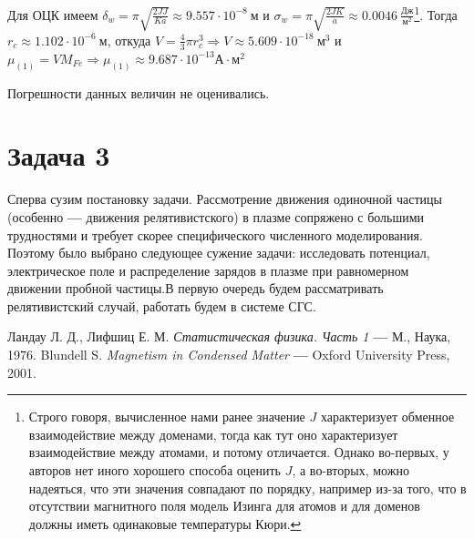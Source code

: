 \documentclass[oneside,final,14pt]{extarticle}
\begin{document}
	Для ОЦК имеем $\delta_{w}=\pi \sqrt{\frac{2JJ}{Ka}}\approx 9.557\cdot 10^{-8} \ \text{м}$ и $\sigma_{w}=\pi \sqrt{\frac{2JK}{a}}\approx 0.0046 \ \frac{\text{Дж}}{\text{м}^2}$\footnote{Строго говоря, вычисленное нами ранее значение $J$ характеризует обменное взаимодействие между доменами, тогда как тут оно характеризует взаимодействие между атомами, и потому отличается. Однако во-первых, у авторов нет иного хорошего способа оценить $J$, а во-вторых, можно надеяться, что эти значения совпадают по порядку, например из-за того, что в отсутствии магнитного поля модель Изинга для атомов и для доменов должны иметь одинаковые температуры Кюри.}. Тогда $r_{c} \approx 1.102 \cdot 10^{-6} \ \text{м}$, откуда $V=\frac{4}{3}\pi r_{c}^3 \Rightarrow \boxed{V \approx 5.609 \cdot 10^{-18} \ \text{м}^3}$ и $\mu_{(1)}=VM_{Fe} \Rightarrow \boxed{\mu_{(1)}\approx 9.687 \cdot 10^{-13} \text{А}\cdot\text{м}^2}$

	Погрешности данных величин не оценивались.
	\newpage
	
	\section{Задача 3}
	
	Сперва сузим постановку задачи. Рассмотрение движения одиночной частицы (особенно \textbf{---} движения релятивистского) в плазме сопряжено с большими трудностями и требует скорее специфического численного моделирования. Поэтому было выбрано следующее сужение задачи: исследовать потенциал, электрическое поле и распределение зарядов в плазме при равномерном движении пробной частицы.В первую очередь будем рассматривать релятивистский случай, работать будем в системе СГС.  

	\newpage
	\begin{thebibliography}{0}
		 Ландау Л. Д., Лифшиц Е. М. \textit{Статистическая физика. Часть 1} \textbf{---} М., Наука, 1976.
		 Blundell S. \textit{Magnetism in Condensed Matter} \textbf{---} Oxford University Press, 2001.
	\end{thebibliography}
\end{document}
